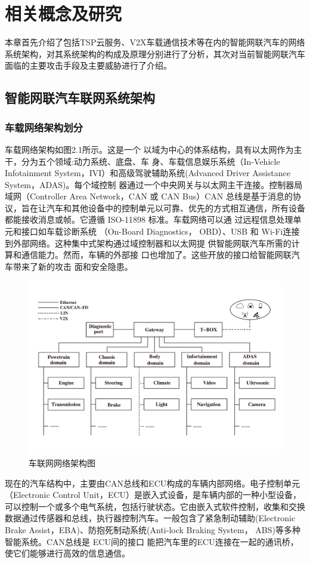 \chapter{相关概念及研究}
\label{ch2}

本章首先介绍了包括TSP云服务、V2X车载通信技术等在内的智能网联汽车的网络系统架构，对其系统架构的构成及原理分别进行了分析，其次对当前智能网联汽车面临的主要攻击手段及主要威胁进行了介绍。

\section{智能网联汽车联网系统架构}

\subsection{车载网络架构划分}
车载网络架构如图2.1所示。这是一个
以域为中心的体系结构，具有以太网作为主干，分为五个领域:动力系统、底盘、车
身、车载信息娱乐系统（In-Vehicle Infotainment System，IVI）和高级驾驶辅助系统(Advanced Driver Assistance System，ADAS)。每个域控制
器通过一个中央网关与以太网主干连接。控制器局域网（Controller Area Network，CAN 或 CAN Bus）CAN 总线是基于消息的协议，旨在让汽车和其他设备中的控制单元以可靠、优先的方式相互通信，所有设备都能接收消息或帧。它遵循 ISO-11898 标准。车载网络可以通
过远程信息处理单元和接口如车载诊断系统 （On-Board Diagnostics， OBD）、USB 和 Wi-Fi连接
到外部网络。这种集中式架构通过域控制器和以太网提
供智能网联汽车所需的计算和通信能力。然而，车辆的外部接
口也增加了。这些开放的接口给智能网联汽车带来了新的攻击
面和安全隐患。
\begin{figure}
  \centering
  \includegraphics[scale=0.4]{resources/img/i1.jpg}
  \caption{车联网网络架构图}
\end{figure}
现在的汽车结构中，主要由CAN总线和ECU构成的车辆内部网络。电子控制单元 （Electronic Control Unit，ECU）是嵌入式设备，是车辆内部的一种小型设备，可以控制一个或多个电气系统，包括行驶状态。它由嵌入式软件控制，收集和交换数据通过传感器和总线，执行器控制汽车。一般包含了紧急制动辅助(Electronic Brake Assist，EBA)、防抱死制动系统(Anti-lock Braking System， ABS)等多种智能系统。CAN总线是 ECU间的接口
能把汽车里的ECU连接在一起的通讯桥，使它们能够进行高效的信息通信。

